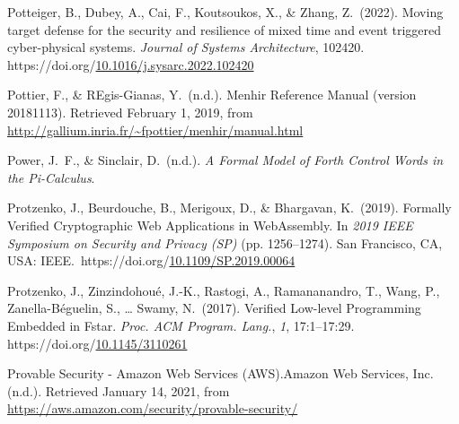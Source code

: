\documentclass[12pt,twoside]{article}
\begin{document}
{\begin{thebibliography}{1079}
\mdbibitemlabel{}Potteiger, B., Dubey, A., Cai, F., Koutsoukos, X., \& Zhang, Z.~(2022). Moving target defense for the security and resilience of mixed time and event triggered cyber-physical systems. \emph{Journal of Systems Architecture}, 102420. https://doi.org/\href{https://dx.doi.org/10.1016/j.sysarc.2022.102420}{10.1016/j.sysarc.2022.102420}%

\mdbibitemlabel{}Pottier, F., \& REgis-Gianas, Y.~(n.d.). Menhir Reference Manual (version 20181113). Retrieved February 1, 2019, from \href{http://gallium.inria.fr/~fpottier/menhir/manual.html}{{\ttfamily http://\hspace{0pt}gallium.\hspace{0pt}inria.\hspace{0pt}fr/\hspace{0pt}\textasciitilde{}fpottier/\hspace{0pt}menhir/\hspace{0pt}manual.\hspace{0pt}html}}%

\mdbibitemlabel{}Power, J.~F., \& Sinclair, D.~(n.d.). \emph{A Formal Model of Forth Control Words in the Pi-Calculus}.%

\mdbibitemlabel{}Protzenko, J., Beurdouche, B., Merigoux, D., \& Bhargavan, K.~(2019). Formally Verified Cryptographic Web Applications in WebAssembly. In \emph{2019 IEEE Symposium on Security and Privacy (SP)} (pp. 1256–1274). San Francisco, CA, USA: IEEE.~https://doi.org/\href{https://dx.doi.org/10.1109/SP.2019.00064}{10.1109/SP.2019.00064}%

\mdbibitemlabel{}Protzenko, J., Zinzindohoué, J.-K., Rastogi, A., Ramananandro, T., Wang, P., Zanella-Béguelin, S., … Swamy, N.~(2017). Verified Low-level Programming Embedded in Fstar. \emph{Proc. ACM Program. Lang.}, \emph{1}, 17:1–17:29. https://doi.org/\href{https://dx.doi.org/10.1145/3110261}{10.1145/3110261}%

\mdbibitemlabel{}Provable Security - Amazon Web Services (AWS).Amazon Web Services, Inc. (n.d.). Retrieved January 14, 2021, from \href{https://aws.amazon.com/security/provable-security/}{{\ttfamily https://\hspace{0pt}aws.\hspace{0pt}amazon.\hspace{0pt}com/\hspace{0pt}security/\hspace{0pt}provable-\hspace{0pt}security/\hspace{0pt}}}%


\end{thebibliography}}
\end{document}
